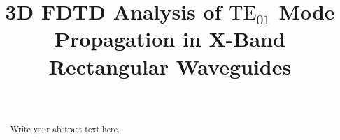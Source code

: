 \documentclass[journal]{IEEEtran}
\begin{document}
\title{3D FDTD Analysis of $\mathrm{TE_{01}}$ Mode Propagation in X-Band Rectangular Waveguides}

\author{
\\
}

\maketitle

\begin{abstract}
Write your abstract text here.
\end{abstract}

\IEEEpeerreviewmaketitle

%



%
%
%






\end{document}
